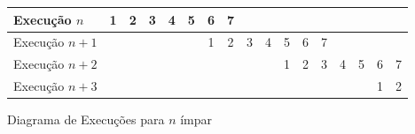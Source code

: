 \begin{figure}[H]
\centering
\begin{tabular}{|l||c|c|c|c|c|c|c|c|c|c|c|c|c|c|c|c|}
\hline
Execução $n$ & 1 & 2 & 3 & 4 & 5 & 6 & 7 &&&&&&&&&\\
\hline
Execução $n+1$ &&&&&& 1 & 2 & 3 & 4 & 5 & 6 & 7 &&&&\\
\hline
Execução $n+2$ &&&&&&&&&& 1 & 2 & 3 & 4 & 5 & 6 & 7 \\
\hline
Execução $n+3$ &&&&&&&&&&&&&&& 1 & 2 \\
\hline
\end{tabular}
\caption{Diagrama de Execuções para $n$ ímpar}
\label{fig:datapath}
\end{figure}